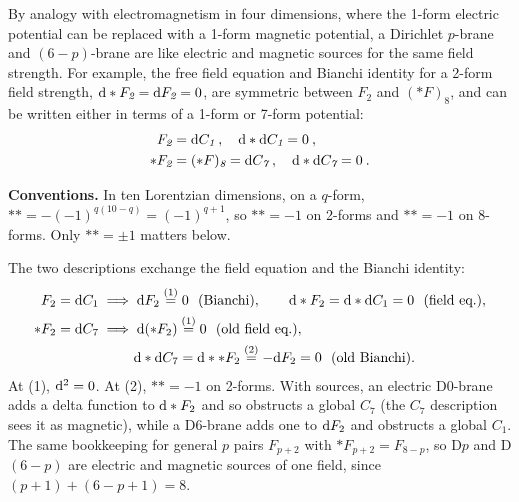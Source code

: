 By analogy with electromagnetism in four dimensions, where the 1-form electric potential can be replaced with a 1-form magnetic potential, a Dirichlet $p$-brane and $(6-p)$-brane are like electric and magnetic sources for the same field strength. For example, the free field equation and Bianchi identity for a 2-form field strength, $\mathrm{d} * F_{\textit{2}} = \mathrm{d} F_{\textit{2}} = 0$, are symmetric between $F_{\textit{2}}$ and $(*F)_{\textit{8}}$, and can be written either in terms of a 1-form or 7-form potential:
\begin{subequations} \label{13.2.8}
	\begin{align}
		F_{\textit{2}} &= \mathrm{d} C_{\textit{1}} \:, \quad \mathrm{d} * \mathrm{d} C_{\textit{1}} = 0 \:, \label{13.2.8a} \\
		*F_{\textit{2}} &= (*F)_{\textit{8}} = \mathrm{d} C_{\textit{7}} \:, \quad \mathrm{d} * \mathrm{d} C_{\textit{7}} = 0 \:. \label{13.2.8b}
	\end{align}
\end{subequations}
\begin{tcolorbox}[breakable]
	\begin{remark}
		\textbf{Conventions.} In ten Lorentzian dimensions, on a $q$-form, $**=-(-1)^{q(10-q)}=(-1)^{q+1}$, so $**=-1$ on 2-forms and $**=-1$ on 8-forms. Only $**=\pm1$ matters below.

		The two descriptions exchange the field equation and the Bianchi identity:
		\begin{align*}
			F_2=\dif C_1 &\;\Longrightarrow\; \dif F_2 \eqs{1} 0 \ \ \text{(Bianchi)},\qquad \dif*F_2=\dif*\dif C_1=0 \ \ \text{(field eq.)},\\
			*F_2=\dif C_7 &\;\Longrightarrow\; \dif(*F_2) \eqs{1} 0 \ \ \text{(old field eq.)},\\
			&\hphantom{\;\Longrightarrow\;}\ \dif*\dif C_7=\dif**F_2 \eqs{2} -\dif F_2 = 0 \ \ \text{(old Bianchi)}.
		\end{align*}
		At (1), $\mathrm{d}^2=0$. At (2), $**=-1$ on 2-forms. With sources, an electric D0-brane adds a delta function to $\mathrm{d}*F_2$ and so obstructs a global $C_7$ (the $C_7$ description sees it as magnetic), while a D6-brane adds one to $\mathrm{d} F_2$ and obstructs a global $C_1$. The same bookkeeping for general $p$ pairs $F_{p+2}$ with $*F_{p+2}=F_{8-p}$, so D$p$ and D$(6-p)$ are electric and magnetic sources of one field, since $(p+1)+(6-p+1)=8$.
	\end{remark}
\end{tcolorbox}
